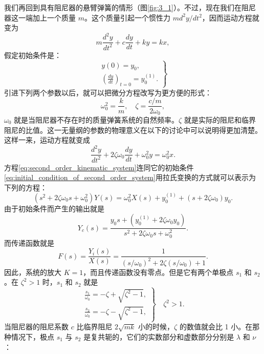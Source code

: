 我们再回到具有阻尼器的悬臂弹簧的情形（图\ref{fig:3_1}）。不过，现在我们在阻尼器这一端加上一个质量 $m$。这个质量引起一个惯性力 $m d^2 y / dt^2$，因而运动方程就变为
\begin{equation*}
m \frac{d^2 y}{dt^2} + c \frac{dy}{dt} + ky = kx,
\end{equation*}
假定初始条件是：
\begin{equation}\label{eq:initial_condition_of_second_order_system}
\left.
\begin{array}{l}
y(0) = y_0, \\
\left(\frac{dy}{dt}\right)_{t=0} = y_0^{(1)}.
\end{array}\right\}
\end{equation}
引进下列两个参数以后，就可以把微分方程改写为更方便的形式：
\begin{equation}\label{eq:ch3_omega_zeta}
\omega_0^2 = \frac{k}{m},\quad \zeta = \frac{c/m}{2\omega_0},
\end{equation}
$\omega_0$ 就是当阻尼器不存在时的质量弹簧系统的自然频率。$\zeta$ 就是实际的阻尼和临界阻尼的比值。这一无量纲的参数的物理意义在以下的讨论中可以说明得更加清楚。这样一来，运动方程就变成
\begin{equation}\label{eq:second_order_kinematic_system}
\frac{d^2 y}{dt^2} + 2\zeta \omega_0 \frac{dy}{dt} + \omega_0^2 y = \omega_0^2 x.
\end{equation}
方程\eqref{eq:second_order_kinematic_system}连同它的初始条件\eqref{eq:initial_condition_of_second_order_system}用拉氏变换的方式就可以表示为下列的方程：
\begin{equation*}
(s^2 + 2\zeta \omega_0 s + \omega_0^2 )Y(s) = \omega_0^2 X(s) + y_0^{(1)} + (s + 2\zeta \omega_0 )y_0.
\end{equation*}
由于初始条件而产生的输出就是
\begin{equation}\label{eq:output_of_second_order_system_from_initial_condition}
Y_c(s) = \frac{y_0 s + (y_0^{(1)} + 2\zeta \omega_0 y_0)}{s^2 + 2\zeta \omega_0 s + \omega_0^2}.
\end{equation}
而传递函数就是
\begin{equation}\label{eq:transer_function_with_s_omega}
F(s) = \frac{Y_i(s)}{X(s)} = \frac{1}{(s/\omega_0)^2 + 2\zeta (s/\omega_0) + 1}.
\end{equation}
因此，系统的放大 $K = 1$，而且传递函数没有零点。但是它有两个单极点 $s_1$ 和 $s_2$。在 $\zeta^2 > 1$ 时，$s_1$ 和 $s_2$ 就是
\begin{equation}\label{eq:s1_w0_s2_w0}
\left.
\begin{array}{l}
\frac{s_1}{\omega_0} = -\zeta + \sqrt{\zeta^2 - 1}, \\
\frac{s_2}{\omega_0} = -\zeta - \sqrt{\zeta^2 - 1},
\end{array}
\right\}\quad
\zeta^2 > 1.
\end{equation}
当阻尼器的阻尼系数 $c$ 比临界阻尼 $2\sqrt{mk}$ 小的时候，$\zeta$ 的数值就会比 1 小。在那种情况下，极点 $s_1$ 与 $s_2$ 是复共轭的，它们的实数部分和虚数部分分别是 $\lambda$ 和 $\nu$：

